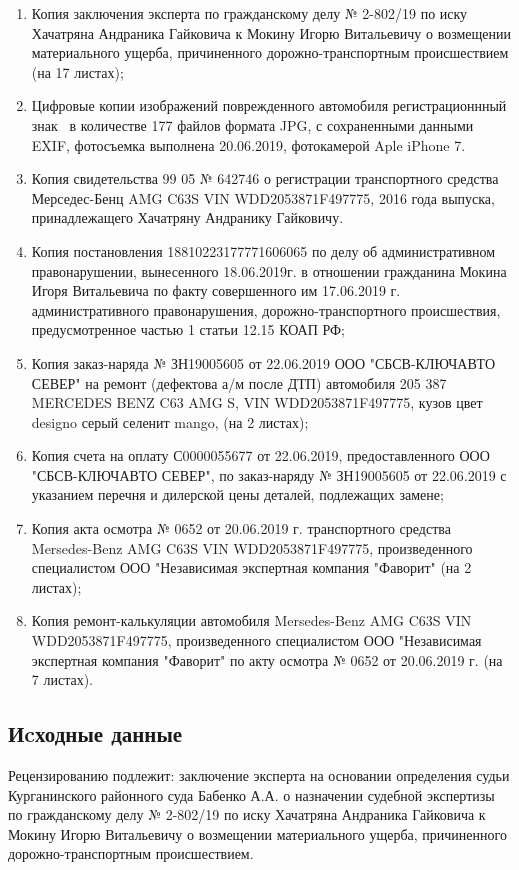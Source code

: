 \begin{enumerate}
\item Копия заключения эксперта  по гражданскому делу № 2-802/19 по иску Хачатряна Андраника Гайковича к Мокину Игорю Витальевичу о возмещении материального ущерба, причиненного дорожно-транспортным происшествием (на 17 листах);
\item  Цифровые копии изображений  поврежденного автомобиля  регистрационнный знак  \, в количестве 177 файлов формата JPG, с сохраненными данными EXIF,  фотосъемка выполнена 20.06.2019, фотокамерой Aple iPhone 7.  
\item Копия свидетельства 99 05 № 642746 о регистрации транспортного средства Мерседес-Бенц  AMG C63S VIN WDD2053871F497775, 2016 года выпуска,  принадлежащего Хачатряну Андранику Гайковичу. 
\item Копия постановления 18810223177771606065 по делу об административном правонарушении, вынесенного 18.06.2019г. в отношении гражданина Мокина Игоря Витальевича по факту совершенного им  17.06.2019 г. административного правонарушения, дорожно-транспортного происшествия, предусмотренное частью 1 статьи 12.15 КОАП РФ;
\item Копия заказ-наряда № ЗН19005605 от 22.06.2019 ООО "СБСВ-КЛЮЧАВТО СЕВЕР" на ремонт (дефектова а/м после ДТП) автомобиля 205 387 MERCEDES  BENZ C63 AMG S, VIN WDD2053871F497775, кузов цвет designo серый селенит mango, (на 2 листах);
\item Копия счета на оплату С0000055677 от 22.06.2019, предоставленного ООО "СБСВ-КЛЮЧАВТО СЕВЕР", по заказ-наряду № ЗН19005605 от 22.06.2019 с указанием перечня и дилерской цены деталей, подлежащих замене;  
\item Копия  акта осмотра № 0652 от 20.06.2019 г. транспортного средства Mersedes-Benz AMG C63S VIN WDD2053871F497775, произведенного специалистом ООО "Независимая экспертная компания "Фаворит" (на 2 листах);
\item  Копия  ремонт-калькуляции автомобиля Mersedes-Benz AMG C63S VIN WDD2053871F497775, произведенного специалистом ООО "Независимая экспертная компания "Фаворит" по акту осмотра № 0652 от 20.06.2019 г. (на 7 листах).
\end{enumerate}


\subsection{ Иcходные данные}

Рецензированию подлежит: заключение эксперта  на основании определения судьи Курганинского районного суда Бабенко А.А. о назначении судебной экспертизы по гражданскому делу № 2-802/19 по иску Хачатряна Андраника Гайковича к Мокину Игорю Витальевичу о возмещении материального ущерба, причиненного дорожно-транспортным происшествием.

